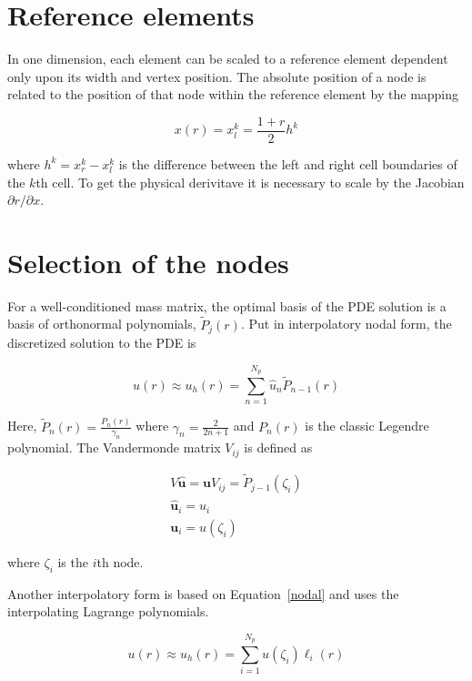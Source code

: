 \documentclass{article}
\begin{document}
\section{Reference elements}


In one dimension, each element can be scaled to a reference element
dependent only upon its width and vertex position. The absolute
position of a node is related to the position of that node within the reference element by
the mapping

\begin{equation}
x(r) = x_l^k=\frac{1+r}{2}h^k
\label{mapping}
\end{equation}

where $h^k=x_r^k-x_l^k$ is the difference between the left and right
cell boundaries of the $k$th cell. To get the physical derivitave it
is necessary to scale by the Jacobian $\partial r/\partial x$.


\section{Selection of the nodes}

For a well-conditioned mass matrix, the optimal basis of the PDE
solution is a basis of orthonormal polynomials, $\widetilde{P}_j(r)$. Put in interpolatory nodal form, the discretized solution to the PDE is 

\begin{equation}
u(r)\approx u_h(r)=\displaystyle\sum_{n=1}^{N_p}\hat{u}_n\widetilde{P}_{n-1}(r)
\label{nodalPoly}
\end{equation}

Here, $\widetilde{P}_n(r)=\frac{P_n(r)}{\gamma_n}$ where
$\gamma_n=\frac{2}{2n+1}$ and $P_n(r)$ is the classic Legendre
  polynomial. The Vandermonde matrix $V_{ij}$ is defined as

\begin{eqnarray}
V\boldsymbol{\hat{u}}=\boldsymbol{u}
V_{ij}=\widetilde{P}_{j-1}(\zeta_i)\\
\boldsymbol{\hat{u}}_i=u_i\\
\boldsymbol{u}_i=u(\zeta_i)
\label{vandermonde}
\end{eqnarray}

where $\zeta_i$ is the $i$th node.


Another interpolatory form is based on Equation~\ref{nodal} and uses
the interpolating Lagrange polynomials.

\begin{equation}
u(r)\approx u_h(r)=\displaystyle\sum_{i=1}^{N_p}u(\zeta_i)\ell_i(r)
\label{nodal2}
\end{equation}
\end{document}

